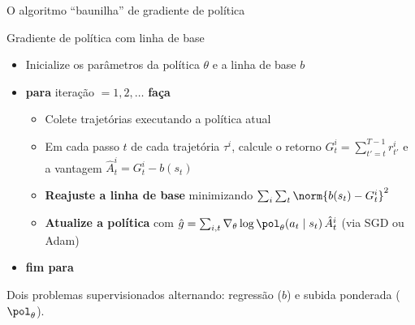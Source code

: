 \documentclass[aspectratio=169, 11pt]{beamer}
\newcommand{\thv}{\theta}                       %
\newcommand{\polth}{\pol_{\thv}}                %
\newcommand{\gth}{\nabla_{\thv}}                %
\newcommand{\traj}{\tau}                        %
\newcommand{\Ahat}{\hat{A}}
\begin{document}
\begin{frame}{O algoritmo ``baunilha'' de gradiente de política}

  \begin{algbox}{Gradiente de política com linha de base}
    {\footnotesize
    \begin{itemize}\setlength{\itemsep}{0.15ex}
      \item Inicialize os parâmetros da política $\thv$ e a linha de base $b$
      \item \textbf{para} iteração $=1,2,\dots$ \textbf{faça}
        \begin{itemize}\setlength{\itemsep}{0.1ex}
          \item Colete trajetórias executando a política atual
          \item Em cada passo $t$ de cada trajetória $\traj^i$, calcule o
            retorno $G^i_t = \sum_{t'=t}^{T-1} r^i_{t'}$ e a vantagem
            $\Ahat^i_t = G^i_t - b(s_t)$
          \item \textbf{Reajuste a linha de base} minimizando
            $\sum_i \sum_t \norm{b(s_t) - G^i_t}^2$
          \item \textbf{Atualize a política} com
            $\hat{g} = \sum_{i,t} \gth \log \polth(a_t\mid s_t)\, \Ahat^i_t$
            (via SGD ou Adam)
        \end{itemize}
      \item \textbf{fim para}
    \end{itemize}}
  \end{algbox}

  \vspace{-0.6em}
  \begin{ideiabox}
    Dois problemas supervisionados alternando: regressão ($b$) e subida
    ponderada ($\polth$).
  \end{ideiabox}
\end{frame}
\end{document}
